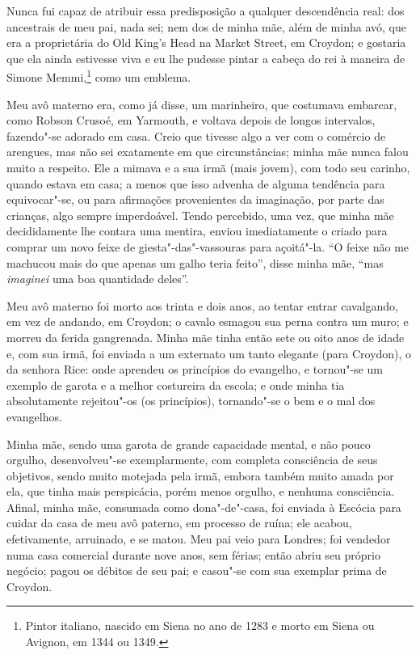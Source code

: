 Nunca fui capaz de atribuir essa predisposição a qualquer
descendência real: dos ancestrais de meu pai, nada sei; nem dos de minha
mãe, além de minha avó, que era a proprietária do Old King's Head na
Market Street, em Croydon; e gostaria que ela ainda estivesse viva e eu
lhe pudesse pintar a cabeça do rei à maneira de Simone Memmi,\footnote{Pintor
  italiano, nascido em Siena no ano de 1283 e morto em Siena ou Avignon, em 1344 ou 1349.} como um emblema.

Meu avô materno era, como já disse, um marinheiro, que costumava
embarcar, como Robson Crusoé, em Yarmouth, e voltava depois de longos
intervalos, fazendo"-se adorado em casa. Creio que tivesse algo a ver com
o comércio de arengues, mas não sei exatamente em que circunstâncias;
minha mãe nunca falou muito a respeito. Ele a mimava e a sua irmã (mais
jovem), com todo seu carinho, quando estava em casa; a menos que isso
advenha de alguma tendência para equivocar"-se, ou para afirmações
provenientes da imaginação, por parte das crianças, algo sempre
imperdoável. Tendo percebido, uma vez, que minha mãe decididamente lhe
contara uma mentira, enviou imediatamente o criado para comprar um novo
feixe de giesta"-das"-vassouras para açoitá"-la. ``O feixe não me machucou
mais do que apenas um galho teria feito'', disse minha mãe, ``mas
\textit{imaginei} uma boa quantidade deles''.

Meu avô materno foi morto aos trinta e dois anos, ao tentar entrar
cavalgando, em vez de andando, em Croydon; o cavalo esmagou sua perna
contra um muro; e morreu da ferida gangrenada. Minha mãe tinha então
sete ou oito anos de idade e, com sua irmã, foi enviada a um externato
um tanto elegante (para Croydon), o da senhora Rice: onde aprendeu os
princípios do evangelho, e tornou"-se um exemplo de garota e a melhor
costureira da escola; e onde minha tia absolutamente rejeitou"-os (os
princípios), tornando"-se o bem e o mal dos evangelhos.

Minha mãe, sendo uma garota de grande capacidade mental, e não pouco
orgulho, desenvolveu"-se exemplarmente, com completa consciência de seus
objetivos, sendo muito motejada pela irmã, embora também muito amada por
ela, que tinha mais perspicácia, porém menos orgulho, e nenhuma
consciência. Afinal, minha mãe, consumada como dona"-de"-casa, foi enviada
à Escócia para cuidar da casa de meu avô paterno, em processo de ruína;
ele acabou, efetivamente, arruinado, e se matou. Meu pai veio para
Londres; foi vendedor numa casa comercial durante nove anos, sem férias;
então abriu seu próprio negócio; pagou os débitos de seu pai; e casou"-se
com sua exemplar prima de Croydon.

